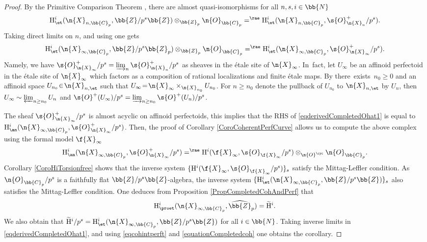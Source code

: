 \begin{proof}
By the Primitive Comparison Theorem \cite[Th.\,5.1]{MR3090230}, there are almost quasi-isomorphisms for all $n,s,i\in \bb{N}$
\[
\mathrm{H}^i_{\et}(\n{X}_{n,\bb{C}_p}, \bb{Z}/p^s \bb{Z})\otimes_{\bb{Z}_p} \n{O}_{\bb{C}_p} =^{\rae} \mathrm{H}^i_{\et}(\n{X}_{n,\bb{C}_p}, \s{O}^+_{\n{X}_n} /p^s).
\]
Taking direct limits on $n$, and using \cite[Cor.,7.18]{MR3090258} one gets
\begin{equation}
\label{eqderivedCompletedOhat1}
\mathrm{H}^i_{\et}(\n{X}_{\infty, \bb{C}_p}, \bb{Z}/p^s \bb{Z}_p) \otimes_{\bb{Z}_p} \n{O}_{\bb{C}_p} =^{\rae} \mathrm{H}^i_{\et}(\n{X}_{\infty, \bb{C}_p}, \s{O}_{\n{X}_{\infty}}^+/p^s).
\end{equation}
Namely, we have $\s{O}^+_{\n{X}_{\infty}}/p^s= \varinjlim_{n} \s{O}^+_{\n{X}_n}/p^s$ as sheaves in the étale site of $\n{X}_{\infty}$. In~fact, let $U_{\infty}$ be an affinoid perfectoid in the étale site of $\n{X}_{\infty}$ which factors as a composition of rational localizations and finite étale maps. By \cite[Lem.\,7.5]{MR3090258} there~exists~\hbox{$n_0\!\geq\!0$} and an affinoid space $U_{n_0}\!\in\!\n{X}_{n,\et}$ such that $U_{\infty}\!=\!\n{X}_{\infty}\times_{\n{X}_{n_0}} U_{n_0}$. For $n\!\geq\!n_0$ denote the pullback of $U_{n_0}$ to $\n{X}_{n,\et}$ by $U_n$, then $U_{\infty}\sim \varprojlim_{n\geq n_0} U_{n}$ and $\s{O}^+(U_{\infty})/p^s=\varinjlim_{n\geq n_0} \s{O}^+(U_n)/p^s$.

The sheaf $\s{O}^+_{\n{X}_{\infty}}/p^s$ is almost acyclic on affinoid perfectoids, this implies that the RHS of \eqref{eqderivedCompletedOhat1} is equal to $\mathrm{H}^i_{\an}(\n{X}_{\infty,\bb{C}_p}, \s{O}^+_{\n{X}_{\infty}}/p^s)$. Then, the proof of Corollary \ref{CoroCoherentPerfCurve} allows us to compute the above complex using the formal model $\f{X}_{\infty}$
\begin{equation}
\label{eqcohintperft}
\mathrm{H}^i_{\an}(\n{X}_{\infty, \bb{C}_p}, \s{O}^+_{\n{X}_{\infty}}/p^s) =^{\rae} \mathrm{H}^i(\f{X}_{\infty}, \s{O}_{\f{X}_{\infty}}/p^s) \otimes_{\n{O}^{\cyc}} \n{O}_{\bb{C}_p}.
\end{equation}
Corollary \ref{CoroHiTorsionfree} shows that the inverse system $\{\mathrm{H}^i(\f{X}_{\infty}, \s{O}_{\f{X}_{\infty}}/p^s)\}_{s}$ satisfy the Mittag-Leffler condition. As $\n{O}_{\bb{C}_p}/p^s$ is a faithfully flat $\bb{Z}/p^s\bb{Z}$-algebra, the inverse system $\{\mathrm{H}^i_{\et}(\n{X}_{\infty, \bb{C}_p}, \bb{Z}/p^s \bb{Z})\}_s$ also satisfies the Mittag-Leffler condition. One deduces from Proposition \ref{PropCompletedCohAndPerf} that
\begin{equation}
\label{equationCompletedcoh}
\mathrm{H}^i_{\proet}(\n{X}_{\infty, \bb{C}_p}, \widehat{\bb{Z}}_p)= \widetilde{\mathrm{H}}^i.
\end{equation}
We also obtain that $\widetilde{\mathrm{H}}^i/p^s= \mathrm{H}^i_{\et}(\n{X}_{\infty,\bb{C}_p}, \bb{Z}/p^s \bb{Z})$ for all $i\in \bb{N}$. Taking inverse limits in \eqref{eqderivedCompletedOhat1}, and using \eqref{eqcohintperft} and \eqref{equationCompletedcoh} one obtains the corollary.
\end{proof}

